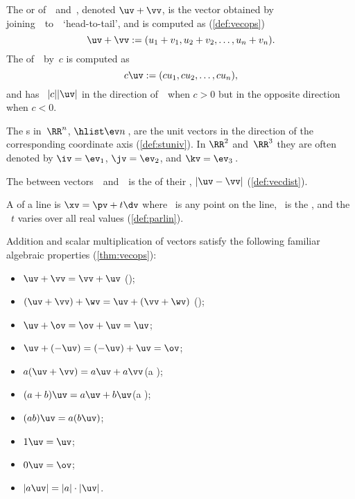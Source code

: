 \begin{itemize}
\itemme The  or  of~\uv\ and~\vv, denoted \(\uv+\vv\), is the vector obtained by joining~\vv\ to~\uv\ `head-to-tail', and is computed as (\cref{def:vecops})
\begin{equation*}
\uv+\vv:=(u_1+v_1,u_2+v_2,\ldots,u_n+v_n).
\end{equation*}
The  of~\uv\ by~\(c\) is computed as
\begin{equation*}
c\uv:=(cu_1,cu_2,\ldots,cu_n),
\end{equation*}
and has ~\(|c||\uv|\) in the direction of~\uv\ when \(c>0\) but in the opposite direction when \(c<0\).

\itemme {}%
The s in~\(\RR^n\), \(\hlist\ev n\)\,, are the unit vectors in the direction of the corresponding coordinate axis (\cref{def:stuniv}).
In \(\RR^2\) and~\(\RR^3\) they are often denoted by \(\iv=\ev_1\), \(\jv=\ev_2\), and \(\kv=\ev_3\)\,.

\itemlo The  between vectors~\uv\ and~\vv\ is the  of their , \(|\uv-\vv|\) (\cref{def:vecdist}).

\itemlo A  of a line is \(\xv=\pv+t\dv\) where \pv~is any point on the line, \dv~is the , and the  ~\(t\) varies over all real values (\cref{def:parlin}).

\itemhi Addition and scalar multiplication of vectors satisfy the following familiar algebraic properties (\cref{thm:vecops}):
\begin{itemize}
\item \(\uv+\vv=\vv+\uv\) \quad();
\item \((\uv+\vv)+\wv=\uv+(\vv+\wv)\) \quad();
\item \(\uv+\ov=\ov+\uv=\uv\);
\item \(\uv+(-\uv)=(-\uv)+\uv=\ov\);
\item \(a(\uv+\vv)=a\uv+a\vv\)\quad(a );
\item \((a+b)\uv=a\uv+b\uv\)\quad(a );
\item \((ab)\uv=a(b\uv)\);
\item \(1\uv=\uv\);
\item \(0\uv=\ov\);
\item \(|a\uv|=|a|\cdot|\uv|\).
\end{itemize}





\end{itemize}
